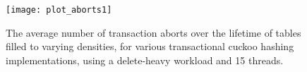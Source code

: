 \documentclass{sig-alternate-05-2015}
\begin{document}
\begin{figure}
  \texttt{[image: plot\_aborts1]}
  \caption{The average number of transaction aborts over the lifetime
    of tables filled to varying densities, for various transactional
    cuckoo hashing implementations, using a delete-heavy workload and
    15 threads.}
  \label{fig_F}
\end{figure}
\end{document}
